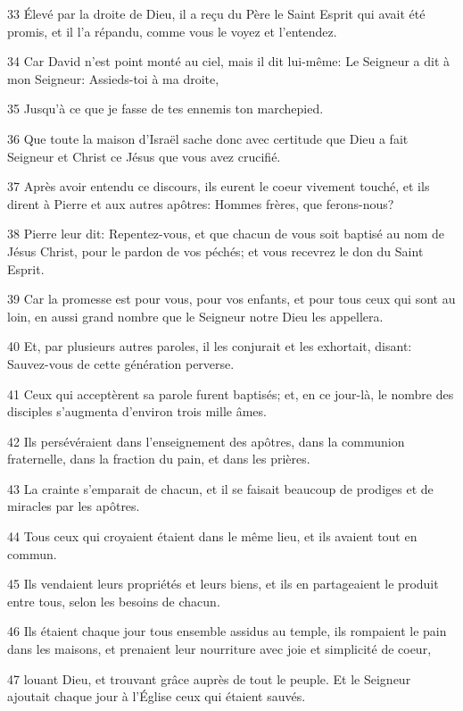 \par 33 Élevé par la droite de Dieu, il a reçu du Père le Saint Esprit qui avait été promis, et il l'a répandu, comme vous le voyez et l'entendez.
\par 34 Car David n'est point monté au ciel, mais il dit lui-même: Le Seigneur a dit à mon Seigneur: Assieds-toi à ma droite,
\par 35 Jusqu'à ce que je fasse de tes ennemis ton marchepied.
\par 36 Que toute la maison d'Israël sache donc avec certitude que Dieu a fait Seigneur et Christ ce Jésus que vous avez crucifié.
\par 37 Après avoir entendu ce discours, ils eurent le coeur vivement touché, et ils dirent à Pierre et aux autres apôtres: Hommes frères, que ferons-nous?
\par 38 Pierre leur dit: Repentez-vous, et que chacun de vous soit baptisé au nom de Jésus Christ, pour le pardon de vos péchés; et vous recevrez le don du Saint Esprit.
\par 39 Car la promesse est pour vous, pour vos enfants, et pour tous ceux qui sont au loin, en aussi grand nombre que le Seigneur notre Dieu les appellera.
\par 40 Et, par plusieurs autres paroles, il les conjurait et les exhortait, disant: Sauvez-vous de cette génération perverse.
\par 41 Ceux qui acceptèrent sa parole furent baptisés; et, en ce jour-là, le nombre des disciples s'augmenta d'environ trois mille âmes.
\par 42 Ils persévéraient dans l'enseignement des apôtres, dans la communion fraternelle, dans la fraction du pain, et dans les prières.
\par 43 La crainte s'emparait de chacun, et il se faisait beaucoup de prodiges et de miracles par les apôtres.
\par 44 Tous ceux qui croyaient étaient dans le même lieu, et ils avaient tout en commun.
\par 45 Ils vendaient leurs propriétés et leurs biens, et ils en partageaient le produit entre tous, selon les besoins de chacun.
\par 46 Ils étaient chaque jour tous ensemble assidus au temple, ils rompaient le pain dans les maisons, et prenaient leur nourriture avec joie et simplicité de coeur,
\par 47 louant Dieu, et trouvant grâce auprès de tout le peuple. Et le Seigneur ajoutait chaque jour à l'Église ceux qui étaient sauvés.

